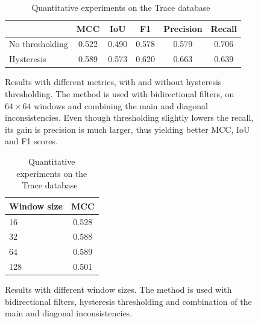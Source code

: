 \documentclass{ipol}
\begin{document}
\begin{table}[ht]
        \begin{subfigure}[b]{.56\linewidth}
                \centering
                \begin{tabular}{lccccc}
                        \toprule
                        &MCC&IoU&F1&\scriptsize Precision&\scriptsize Recall\\
                        \midrule
                        \scriptsize No thresholding & 0.522 & 0.490 & 0.578 & 0.579 & 0.706\\
                        \scriptsize Hysteresis & 0.589 & 0.573 & 0.620 & 0.663 & 0.639\\
                        \bottomrule
                \end{tabular}
                \caption{Results with different metrics, with and without hysteresis thresholding. The method is used with bidirectional filters, on $64\times64$ windows and combining the main and diagonal inconsistencies. Even though thresholding slightly lowers the recall, its gain is precision is much larger, thus yielding better MCC, IoU and F1 scores.}
        \end{subfigure}\hfill%
        \begin{subfigure}[b]{.4\linewidth}
                \centering
                \begin{tabular}{lc}
                        \toprule
                        \scriptsize Window size & MCC\\
                        \midrule
                        16 & 0.528\\
                        32 & 0.588\\
                        64 & 0.589\\
                        128 & 0.501\\
                        \bottomrule
                \end{tabular}
                \caption{Results with different window sizes. The method is used with bidirectional filters, hysteresis thresholding and combination of the main and diagonal inconsistencies.}
        \end{subfigure}
        \caption{Quantitative experiments on the Trace database~\cite{trace}}
        \label{tab:quantitative}
\end{table}
\end{document}
